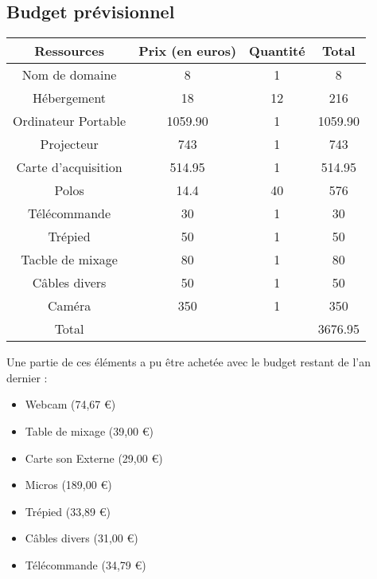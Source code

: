 \documentclass[12pt]{report}
\begin{document}
  \subsection{Budget prévisionnel}
\begin{tabular}{|c|c|c|c|}
          \hline
          Ressources & Prix (en euros) & Quantité & Total\\
          \hline
          Nom de domaine & 8 & 1 & 8\\
          Hébergement & 18 & 12 & 216\\
          Ordinateur Portable & 1059.90 & 1 & 1059.90\\
          Projecteur & 743 & 1 & 743\\
          Carte d'acquisition & 514.95 & 1 & 514.95\\
          Polos & 14.4 & 40 & 576\\
          Télécommande & 30 & 1 & 30\\
          Trépied & 50 & 1 & 50\\
          Tacble de mixage & 80 & 1 & 80\\
          Câbles divers & 50 & 1 & 50\\
          Caméra & 350 & 1 & 350\\
          \hline
          Total &  & & 3676.95\\
          \hline
  \end{tabular}
  \newline
  Une partie de ces éléments a pu être achetée avec le budget restant de l'an
  dernier :
    \begin{itemize}
          \item Webcam (74,67 \euro{})
          \item Table de mixage (39,00 \euro{})
          \item Carte son Externe (29,00 \euro{})
          \item Micros (189,00 \euro{})
          \item Trépied (33,89 \euro{})
          \item Câbles divers (31,00 \euro{})
          \item Télécommande (34,79 \euro{})
  \end{itemize}
\end{document}
